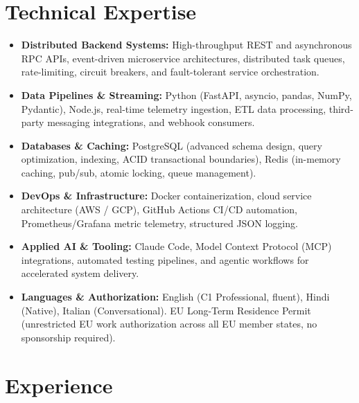 \documentclass[10pt,a4paper]{article}
\begin{document}
\section{Technical Expertise}
\begin{itemize}
  \item \textbf{Distributed Backend Systems:} High-throughput REST and asynchronous RPC APIs, event-driven microservice architectures, distributed task queues, rate-limiting, circuit breakers, and fault-tolerant service orchestration.
  \item \textbf{Data Pipelines \& Streaming:} Python (FastAPI, asyncio, pandas, NumPy, Pydantic), Node.js, real-time telemetry ingestion, ETL data processing, third-party messaging integrations, and webhook consumers.
  \item \textbf{Databases \& Caching:} PostgreSQL (advanced schema design, query optimization, indexing, ACID transactional boundaries), Redis (in-memory caching, pub/sub, atomic locking, queue management).
  \item \textbf{DevOps \& Infrastructure:} Docker containerization, cloud service architecture (AWS / GCP), GitHub Actions CI/CD automation, Prometheus/Grafana metric telemetry, structured JSON logging.
  \item \textbf{Applied AI \& Tooling:} Claude Code, Model Context Protocol (MCP) integrations, automated testing pipelines, and agentic workflows for accelerated system delivery.
  \item \textbf{Languages \& Authorization:} English (C1 Professional, fluent), Hindi (Native), Italian (Conversational). EU Long-Term Residence Permit (unrestricted EU work authorization across all EU member states, no sponsorship required).
\end{itemize}

\section{Experience}
\end{document}

